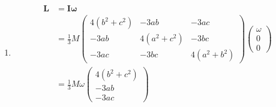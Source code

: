 \documentclass{article}
\renewcommand{\vec}[1]{\boldsymbol{\mathbf{#1}}}
\begin{document}
\begin{enumerate}
  \item

        \begin{align*}
          \vec{L} & = \vec{I} \vec{\omega}                                        \\
                  & = \frac{1}{3} M \begin{pmatrix}
                                      4 (b^2 + c^2) & -3 a b        & -3 a c        \\
                                      -3 a b        & 4 (a^2 + c^2) & -3 b c        \\
                                      -3 a c        & -3 b c        & 4 (a^2 + b^2)
                                    \end{pmatrix} \begin{pmatrix}
                                                    \omega \\
                                                    0      \\
                                                    0
                                                  \end{pmatrix} \\
                  & = \frac{1}{3} M \omega \begin{pmatrix}
                                             4 (b^2 + c^2) \\
                                             -3 a b        \\
                                             -3 a c
                                           \end{pmatrix}
        \end{align*}
\end{enumerate}

\setcounter{subsection}{34}
\subsection{}
\end{document}
